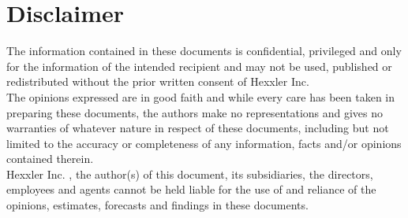 \documentclass[../main.tex]{subfiles}
\begin{document}
	\section*{Disclaimer}
	The information contained in these documents is confidential, privileged and only for the information of the intended recipient and may not be used, published or redistributed without the prior written consent of Hexxler Inc.\\

	The opinions expressed are in good faith and while every care has been taken in preparing these documents, the authors make no representations and gives no warranties of whatever nature in respect of these documents, including but not limited to the accuracy or completeness of any information, facts and/or opinions contained therein.\\

	Hexxler Inc. , the author(s) of this document, its subsidiaries, the directors, employees and agents cannot be held liable for the use of and reliance of the opinions, estimates, forecasts and findings in these documents.
	
	\newpage
\end{document}
